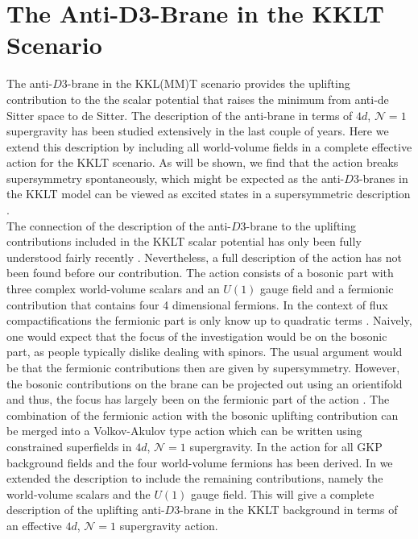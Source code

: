 \documentclass[a4paper,12pt]{report}
\begin{document}
\section[The Anti-$D3$-Brane in the KKLT Scenario]{The Anti-$\mathbf{D3}$-Brane in the KKLT Scenario}
\label{sec:D3barKKLTmain}
The anti-$D3$-brane in the KKL(MM)T scenario \cite{Kachru:2003aw,Kachru:2003sx} provides the uplifting contribution to the the scalar potential that raises the minimum from anti-de Sitter space to de Sitter. The description of the anti-brane in terms of $4d$, $\mathcal{N}=1$ supergravity has been studied extensively in the last couple of years. Here we extend this description by including all world-volume fields in a complete effective action for the KKLT scenario. As will be shown, we find that the action breaks supersymmetry spontaneously, which might be expected as the anti-$D3$-branes in the KKLT model can be viewed as excited states in a supersymmetric description \cite{Kachru:2002gs}.\\
The connection of the description of the anti-$D3$-brane to the uplifting contributions included in the KKLT scalar potential has only been fully understood fairly recently \cite{Ferrara:2014kva,Kallosh:2014wsa,Bergshoeff:2015jxa,Kallosh:2015nia,Garcia-Etxebarria:2015lif}. Nevertheless, a full description of the action has not been found before our contribution. The action consists of a bosonic part with three complex world-volume scalars and an $U(1)$ gauge field and a fermionic contribution that contains four 4 dimensional fermions. In the context of flux compactifications the fermionic part is only know up to quadratic terms \cite{Grana:2002tu,Grana:2003ek,Marolf:2003ye,Tripathy:2005hv,Martucci:2005rb,Bergshoeff:2013pia}. Naively, one would expect that the focus of the investigation would be on the bosonic part, as people typically dislike dealing with spinors. The usual argument would be that the fermionic contributions then are given by supersymmetry. However, the bosonic contributions on the brane can be projected  out using an orientifold and thus, the focus has largely been on the fermionic part of the action \cite{Kallosh:2014wsa,Bergshoeff:2015jxa,Kallosh:2015nia,Garcia-Etxebarria:2015lif,Dasgupta:2016prs,GarciadelMoral:2017vnz}. The combination of the fermionic action with the bosonic uplifting contribution can be merged into a Volkov-Akulov type action \cite{Volkov:1973ix} which can be written using constrained superfields in $4d$, $\mathcal{N}=1$ supergravity. In \cite{GarciadelMoral:2017vnz} the action for all GKP background fields and the four world-volume fermions has been derived. In \cite{Cribiori:2019hod} we extended the description to include the remaining contributions, namely the world-volume scalars and the $U(1)$ gauge field. This will give a complete description of the uplifting anti-$D3$-brane in the KKLT background in terms of an effective $4d$, $\mathcal{N}=1$ supergravity action.
\end{document}
